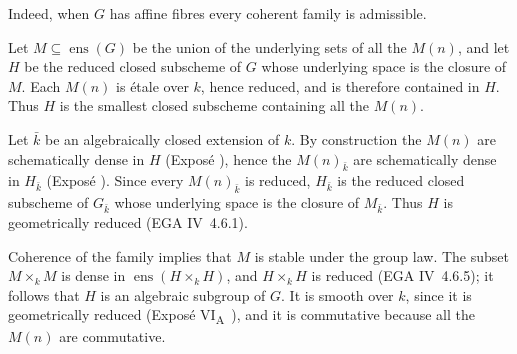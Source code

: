 
Indeed, when \(G\) has affine fibres every coherent family is
admissible.




Let \(M\subseteq\operatorname{ens}(G)\) be the union of the underlying
sets of all the \(M(n)\), and let \(H\) be the reduced closed
subscheme of \(G\) whose underlying space is the closure of \(M\).
Each \(M(n)\) is étale over \(k\), hence reduced, and is therefore
contained in \(H\). Thus \(H\) is the smallest closed subscheme
containing all the \(M(n)\).

Let \(\bar k\) be an algebraically closed extension of \(k\). By
construction the \(M(n)\) are schematically dense in \(H\) (Exposé
), hence the \(M(n)_{\bar k}\) are schematically dense in
\(H_{\bar k}\) (Exposé ). Since every \(M(n)_{\bar k}\) is
reduced, \(H_{\bar k}\) is the reduced closed subscheme of
\(G_{\bar k}\) whose underlying space is the closure of \(M_{\bar k}\).
Thus \(H\) is geometrically reduced (EGA IV~4.6.1).

Coherence of the family implies that \(M\) is stable under the group
law. The subset \(M\times_kM\) is dense in
\(\operatorname{ens}(H\times_kH)\), and \(H\times_kH\) is reduced
(EGA IV~4.6.5); it follows that \(H\) is an algebraic subgroup of
\(G\). It is smooth over \(k\), since it is geometrically reduced
(Exposé VI\textsubscript{A}~), and it is commutative because all
the \(M(n)\) are commutative.

